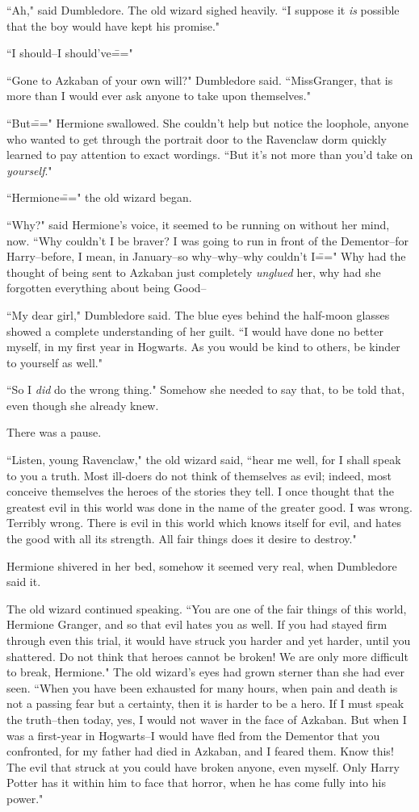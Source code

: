 ``Ah," said Dumbledore. The old wizard sighed heavily. ``I suppose it \emph{is} possible that the boy would have kept his promise."

``I should\---I should've\==="

``Gone to Azkaban of your own will?" Dumbledore said. ``Miss\?Granger, that is more than I would ever ask anyone to take upon themselves."

``But\===" Hermione swallowed. She couldn't help but notice the loophole, anyone who wanted to get through the portrait door to the Ravenclaw dorm quickly learned to pay attention to exact wordings. ``But it's not more than you'd take on \emph{yourself}."

``Hermione\===" the old wizard began.

``Why?" said Hermione's voice, it seemed to be running on without her mind, now. ``Why couldn't I be braver? I was going to run in front of the Dementor\---for Harry\---before, I mean, in January\---so why\---why\---why couldn't I\===" Why had the thought of being sent to Azkaban just completely \emph{unglued} her, why had she forgotten everything about being Good\---

``My dear girl," Dumbledore said. The blue eyes behind the half-moon glasses showed a complete understanding of her guilt. ``I would have done no better myself, in my first year in Hogwarts. As you would be kind to others, be kinder to yourself as well."

``So I \emph{did} do the wrong thing." Somehow she needed to say that, to be told that, even though she already knew.

There was a pause.

``Listen, young Ravenclaw," the old wizard said, ``hear me well, for I shall speak to you a truth. Most ill-doers do not think of themselves as evil; indeed, most conceive themselves the heroes of the stories they tell. I once thought that the greatest evil in this world was done in the name of the greater good. I was wrong. Terribly wrong. There is evil in this world which knows itself for evil, and hates the good with all its strength. All fair things does it desire to destroy."

Hermione shivered in her bed, somehow it seemed very real, when Dumbledore said it.

The old wizard continued speaking. ``You are one of the fair things of this world, Hermione Granger, and so that evil hates you as well. If you had stayed firm through even this trial, it would have struck you harder and yet harder, until you shattered. Do not think that heroes cannot be broken! We are only more difficult to break, Hermione." The old wizard's eyes had grown sterner than she had ever seen. ``When you have been exhausted for many hours, when pain and death is not a passing fear but a certainty, then it is harder to be a hero. If I must speak the truth\---then today, yes, I would not waver in the face of Azkaban. But when I was a first-year in Hogwarts\---I would have fled from the Dementor that you confronted, for my father had died in Azkaban, and I feared them. Know this! The evil that struck at you could have broken anyone, even myself. Only Harry Potter has it within him to face that horror, when he has come fully into his power."

